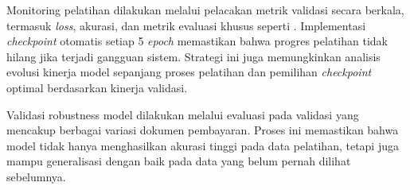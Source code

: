 Monitoring pelatihan dilakukan melalui pelacakan metrik validasi secara berkala, termasuk \emph{loss}, akurasi, dan metrik evaluasi khusus seperti \mcer. Implementasi \emph{checkpoint} otomatis setiap 5 \emph{epoch} memastikan bahwa progres pelatihan tidak hilang jika terjadi gangguan sistem. Strategi ini juga memungkinkan analisis evolusi kinerja model sepanjang proses pelatihan dan pemilihan \emph{checkpoint} optimal berdasarkan kinerja validasi.

Validasi robustness model dilakukan melalui evaluasi pada \dataset{} validasi yang mencakup berbagai variasi dokumen pembayaran. Proses ini memastikan bahwa model tidak hanya menghasilkan akurasi tinggi pada data pelatihan, tetapi juga mampu generalisasi dengan baik pada data yang belum pernah dilihat sebelumnya.
